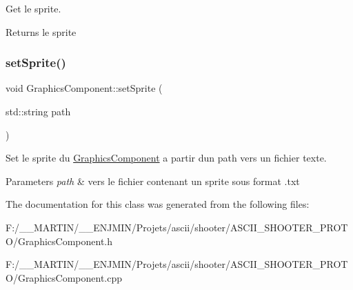 Get le sprite. 

\begin{DoxyReturn}{Returns}
le sprite 
\end{DoxyReturn}
\hypertarget{class_graphics_component_ab3e309ee0a8dcbc1b927d38bf2e1d8c9}{}\label{class_graphics_component_ab3e309ee0a8dcbc1b927d38bf2e1d8c9} 
\subsubsection{\texorpdfstring{set\+Sprite()}{setSprite()}}
{\footnotesize\ttfamily void Graphics\+Component\+::set\+Sprite (\begin{DoxyParamCaption}\item[{std\+::string}]{path }\end{DoxyParamCaption})}



Set le sprite du \hyperlink{class_graphics_component}{Graphics\+Component} a partir d\textquotesingle{}un path vers un fichier texte. 


\begin{DoxyParams}{Parameters}
{\em path} & vers le fichier contenant un sprite sous format .txt \\
\hline
\end{DoxyParams}


The documentation for this class was generated from the following files\+:\begin{DoxyCompactItemize}
\item 
F\+:/\+\_\+\+\_\+\+M\+A\+R\+T\+I\+N/\+\_\+\+\_\+\+E\+N\+J\+M\+I\+N/\+Projets/ascii/shooter/\+A\+S\+C\+I\+I\+\_\+\+S\+H\+O\+O\+T\+E\+R\+\_\+\+P\+R\+O\+T\+O/Graphics\+Component.\+h\item 
F\+:/\+\_\+\+\_\+\+M\+A\+R\+T\+I\+N/\+\_\+\+\_\+\+E\+N\+J\+M\+I\+N/\+Projets/ascii/shooter/\+A\+S\+C\+I\+I\+\_\+\+S\+H\+O\+O\+T\+E\+R\+\_\+\+P\+R\+O\+T\+O/Graphics\+Component.\+cpp\end{DoxyCompactItemize}
